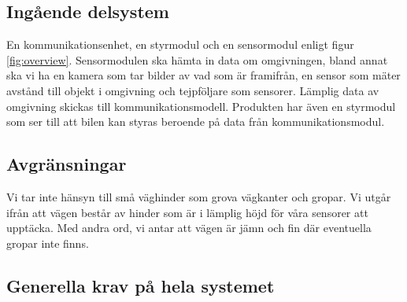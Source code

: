 \documentclass[kravspec/krav.tex]{subfiles}
\begin{document}
\subsection{Ingående delsystem}
En kommunikationsenhet, en styrmodul och en sensormodul enligt figur
\ref{fig:overview}. Sensormodulen ska hämta in data om omgivningen, bland annat
ska vi ha en kamera som tar bilder av vad som är framifrån, en sensor som mäter
avstånd till objekt i omgivning och tejpföljare som sensorer. Lämplig data av
omgivning skickas till kommunikationsmodell. Produkten har även en styrmodul
som ser till att bilen kan styras beroende på data från kommunikationsmodul.

\subsection{Avgränsningar}
Vi tar inte hänsyn till små väghinder som grova vägkanter och gropar.  Vi utgår
ifrån att vägen består av hinder som är i lämplig höjd för våra sensorer att
upptäcka. Med andra ord, vi antar att vägen är jämn och fin där eventuella
gropar inte finns.

\subsection{Generella krav på hela systemet}

\begin{reqlist}
\end{reqlist}
\end{document}
